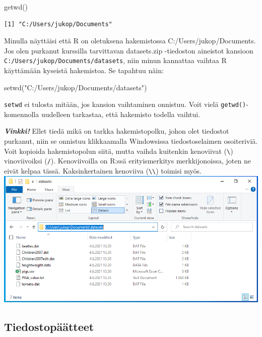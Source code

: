 \documentclass[
]{book}
\newenvironment{Shaded}{\begin{snugshade}}{\end{snugshade}}
\newcommand{\FunctionTok}[1]{\textcolor[rgb]{0.00,0.00,0.00}{#1}}
\newcommand{\NormalTok}[1]{#1}
\newcommand{\StringTok}[1]{\textcolor[rgb]{0.31,0.60,0.02}{#1}}
\begin{document}
\begin{Shaded}
\begin{Highlighting}[]
\FunctionTok{getwd}\NormalTok{()}
\end{Highlighting}
\end{Shaded}

\begin{verbatim}
[1] "C:/Users/jukop/Documents"
\end{verbatim}

Minulla näyttäisi että R on oletuksena hakemistossa C:/Users/jukop/Documents. Jos olen purkanut kurssilla tarvittavan datasets.zip -tiedoston aineistot kansioon \texttt{C:/Users/jukop/Documents/datasets}, niin minun kannattaa vaihtaa R käyttämään kyseistä hakemistoa. Se tapahtuu näin:

\begin{Shaded}
\begin{Highlighting}[]
\FunctionTok{setwd}\NormalTok{(}\StringTok{"C:/Users/jukop/Documents/datasets"}\NormalTok{)}
\end{Highlighting}
\end{Shaded}

\texttt{setwd} ei tulosta mitään, jos kansion vaihtaminen onnistuu. Voit vielä \texttt{getwd()}-komennolla uudelleen tarkastaa, että hakemisto todella vaihtui.

\textbf{\emph{Vinkki!}} Ellet tiedä mikä on tarkka hakemistopolku, johon olet tiedostot purkanut, niin se onnistuu klikkaamalla Windowsissa tiedostoselaimen osoiteriviä. Voit kopioida hakemistopolun siitä, mutta vaihda kuitenkin kenoviivat (\texttt{\textbackslash{}}) vinoviivoiksi (\texttt{/}). Kenoviivoilla on R:ssä erityismerkitys merkkijonoissa, joten ne eivät kelpaa tässä. Kaksinkertainen kenoviiva (\texttt{\textbackslash{}\textbackslash{}}) toimisi myös.
\includegraphics{files/03-reading_data/windows_show_file_path2.png}

\hypertarget{tiedostopuxe4uxe4tteet}{%
\subsection{Tiedostopäätteet}\label{tiedostopuxe4uxe4tteet}}
\end{document}
